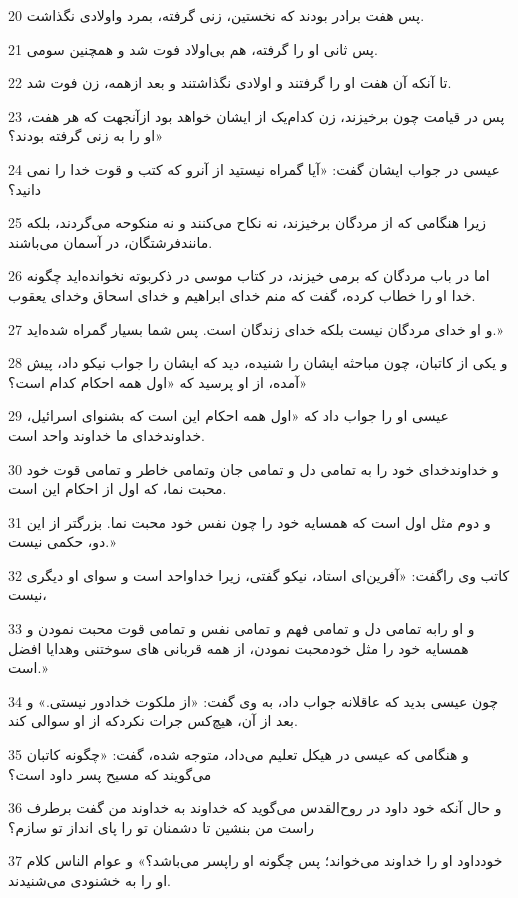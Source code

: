 \par 20 پس هفت برادر بودند که نخستین، زنی گرفته، بمرد واولادی نگذاشت.
\par 21 پس ثانی او را گرفته، هم بی‌اولاد فوت شد و همچنین سومی.
\par 22 تا آنکه آن هفت او را گرفتند و اولادی نگذاشتند و بعد ازهمه، زن فوت شد.
\par 23 پس در قیامت چون برخیزند، زن کدام‌یک از ایشان خواهد بود ازآنجهت که هر هفت، او را به زنی گرفته بودند؟»
\par 24 عیسی در جواب ایشان گفت: «آیا گمراه نیستید از آنرو که کتب و قوت خدا را نمی دانید؟
\par 25 زیرا هنگامی که از مردگان برخیزند، نه نکاح می‌کنند و نه منکوحه می‌گردند، بلکه مانندفرشتگان، در آسمان می‌باشند.
\par 26 اما در باب مردگان که برمی خیزند، در کتاب موسی در ذکربوته نخوانده‌اید چگونه خدا او را خطاب کرده، گفت که منم خدای ابراهیم و خدای اسحاق وخدای یعقوب.
\par 27 و او خدای مردگان نیست بلکه خدای زندگان است. پس شما بسیار گمراه شده‌اید.»
\par 28 و یکی از کاتبان، چون مباحثه ایشان را شنیده، دید که ایشان را جواب نیکو داد، پیش آمده، از او پرسید که «اول همه احکام کدام است؟»
\par 29 عیسی او را جواب داد که «اول همه احکام این است که بشنو‌ای اسرائیل، خداوندخدای ما خداوند واحد است.
\par 30 و خداوندخدای خود را به تمامی دل و تمامی جان وتمامی خاطر و تمامی قوت خود محبت نما، که اول از احکام این است.
\par 31 و دوم مثل اول است که همسایه خود را چون نفس خود محبت نما. بزرگتر از این دو، حکمی نیست.»
\par 32 کاتب وی راگفت: «آفرین‌ای استاد، نیکو گفتی، زیرا خداواحد است و سوای او دیگری نیست،
\par 33 و او رابه تمامی دل و تمامی فهم و تمامی نفس و تمامی قوت محبت نمودن و همسایه خود را مثل خودمحبت نمودن، از همه قربانی های سوختنی وهدایا افضل است.»
\par 34 چون عیسی بدید که عاقلانه جواب داد، به وی گفت: «از ملکوت خدادور نیستی.» و بعد از آن، هیچ‌کس جرات نکردکه از او سوالی کند.
\par 35 و هنگامی که عیسی در هیکل تعلیم می‌داد، متوجه شده، گفت: «چگونه کاتبان می‌گویند که مسیح پسر داود است؟
\par 36 و حال آنکه خود داود در روح‌القدس می‌گوید که خداوند به خداوند من گفت برطرف راست من بنشین تا دشمنان تو را پای انداز تو سازم؟
\par 37 خودداود او را خداوند می‌خواند؛ پس چگونه او راپسر می‌باشد؟» و عوام الناس کلام او را به خشنودی می‌شنیدند.
